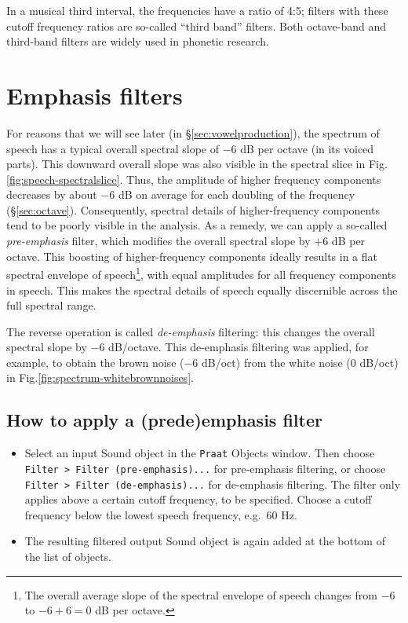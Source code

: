 \documentclass[
]{book}
\begin{document}
In a musical third interval, the frequencies have a ratio of 4:5; filters with these cutoff frequency ratios are so-called ``third band'' filters. Both octave-band and third-band filters are widely used in phonetic research.

\section{Emphasis filters}\label{sec:emphasisfilters}

For reasons that we will see later (in §\ref{sec:vowelproduction}), the spectrum of speech has a typical overall spectral slope of \(-6\) dB per octave (in its voiced parts). This downward overall slope was also visible in the spectral slice in Fig.\ref{fig:speech-spectralslice}. Thus, the amplitude of higher frequency components decreases by about \(-6\) dB on average for each doubling of the frequency (§\ref{sec:octave}).
Consequently, spectral details of higher-frequency components tend to be poorly visible in the analysis. As a remedy, we can apply a so-called \emph{pre-emphasis} filter, which modifies the overall spectral slope by \(+6\) dB per octave. This boosting of higher-frequency components ideally results in a flat spectral envelope of speech\footnote{The overall average slope of the spectral envelope of speech changes from \(-6\) to \(-6+6=0\) dB per octave.}, with equal amplitudes for all frequency components in speech. This makes the spectral details of speech equally discernible across the full spectral range.

The reverse operation is called \emph{de-emphasis} filtering: this changes the overall spectral slope by \(-6\) dB/octave. This de-emphasis filtering was applied, for example, to obtain the brown noise (\(-6\) dB/oct) from the white noise (\(0\) dB/oct) in Fig.\ref{fig:spectrum-whitebrownnoises}.

\label{box-praatemphasis}
\subsection{How to apply a (pre\textbar de)emphasis filter}\label{how-to-apply-a-predeemphasis-filter}

\begin{itemize}
\item
  Select an input Sound object in the \texttt{Praat} Objects window. Then choose \texttt{Filter\ \textgreater{}\ Filter\ (pre-emphasis)...} for pre-emphasis filtering, or choose \texttt{Filter\ \textgreater{}\ Filter\ (de-emphasis)...} for de-emphasis filtering. The filter only applies above a certain cutoff frequency, to be specified. Choose a cutoff frequency below the lowest speech frequency, e.g.~60 Hz.
\item
  The resulting filtered output Sound object is again added at the bottom of the list of objects.
\end{itemize}
\end{document}
